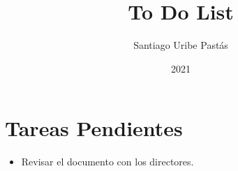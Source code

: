 \documentclass{article}
\title{To Do List}
\author{Santiago Uribe Pastás}
\date{2021}
\begin{document}
\maketitle

\section{Tareas Pendientes}
\begin{itemize}
    \item Revisar el documento con los directores.
\end{itemize}
\end{document}
